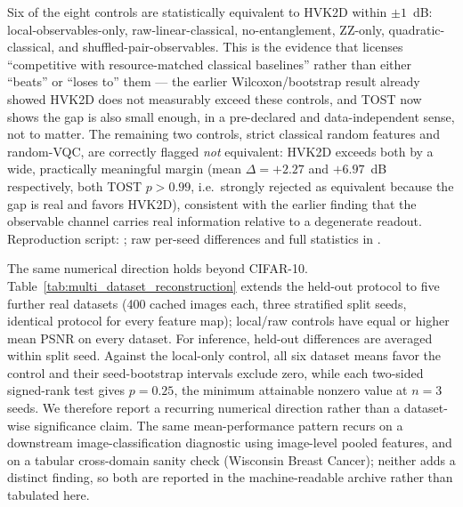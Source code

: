 \documentclass[11pt]{article}
\begin{document}
Six of the eight controls are statistically equivalent to HVK2D within $\pm1$~dB: local-observables-only, raw-linear-classical, no-entanglement, ZZ-only, quadratic-classical, and shuffled-pair-observables. This is the evidence that licenses ``competitive with resource-matched classical baselines'' rather than either ``beats'' or ``loses to'' them --- the earlier Wilcoxon/bootstrap result already showed HVK2D does not measurably exceed these controls, and TOST now shows the gap is also small enough, in a pre-declared and data-independent sense, not to matter. The remaining two controls, strict classical random features and random-VQC, are correctly flagged \emph{not} equivalent: HVK2D exceeds both by a wide, practically meaningful margin (mean $\Delta=+2.27$ and $+6.97$~dB respectively, both TOST $p>0.99$, i.e.\ strongly rejected as equivalent because the gap is real and favors HVK2D), consistent with the earlier finding that the observable channel carries real information relative to a degenerate readout. Reproduction script: ; raw per-seed differences and full statistics in .

The same numerical direction holds beyond CIFAR-10. Table~\ref{tab:multi_dataset_reconstruction} extends the held-out protocol to five further real datasets (400 cached images each, three stratified split seeds, identical protocol for every feature map); local/raw controls have equal or higher mean PSNR on every dataset. For inference, held-out differences are averaged within split seed. Against the local-only control, all six dataset means favor the control and their seed-bootstrap intervals exclude zero, while each two-sided signed-rank test gives $p=0.25$, the minimum attainable nonzero value at $n=3$ seeds. We therefore report a recurring numerical direction rather than a dataset-wise significance claim. The same mean-performance pattern recurs on a downstream image-classification diagnostic using image-level pooled features, and on a tabular cross-domain sanity check (Wisconsin Breast Cancer); neither adds a distinct finding, so both are reported in the machine-readable archive rather than tabulated here.
\end{document}
